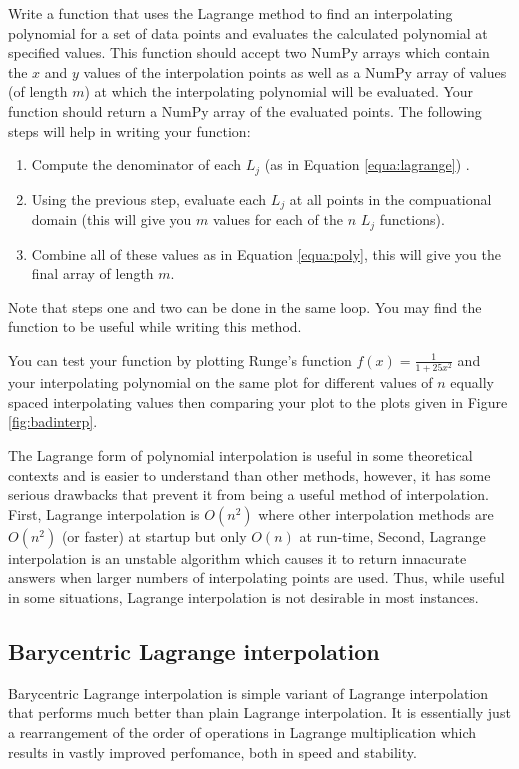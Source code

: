 \begin{problem}
Write a function that uses the Lagrange method to find an interpolating polynomial for a set of data points and evaluates the calculated polynomial at specified values.
This function should accept two NumPy arrays which contain the $x$ and $y$ values of the interpolation points as well as a NumPy array of values (of length $m$) at which the interpolating polynomial
will be evaluated.
Your function should return a NumPy array of the evaluated points.
The following steps will help in writing your function:
\begin{enumerate}
\item Compute the denominator of each $L_j$ (as in Equation \ref{equa:lagrange}) .
\item Using the previous step, evaluate each $L_j$ at all points in the compuational domain (this will give you $m$ values for each of the $n$ $L_j$ functions).
\item Combine all of these values as in Equation \ref{equa:poly}, this will give you the final array of length $m$.
\end{enumerate}
Note that steps one and two can be done in the same loop.
You may find the function  to be useful while writing this method.

You can test your function by plotting Runge's function $f(x)=\frac{1}{1+25x^2}$ and your interpolating polynomial on the same plot for different values of $n$ equally spaced interpolating values then comparing
your plot to the plots given in Figure \ref{fig:badinterp}.
\label{prob:lagrange}
\end{problem}

The Lagrange form of polynomial interpolation is useful in some theoretical contexts and is easier to understand than other methods, however, it has some serious drawbacks that prevent it from being a
useful method of interpolation.
First, Lagrange interpolation is $O(n^2)$ where other interpolation methods are $O(n^2)$ (or faster) at startup but only $O(n)$ at run-time,
Second, Lagrange interpolation is an unstable algorithm which causes it to return innacurate answers when larger numbers of interpolating points are used.
Thus, while useful in some situations, Lagrange interpolation is not desirable in most instances.

\subsection*{Barycentric Lagrange interpolation}
Barycentric Lagrange interpolation is simple variant of Lagrange interpolation that performs much better than plain Lagrange interpolation.
It is essentially just a rearrangement of the order of operations in Lagrange multiplication which results in vastly improved perfomance, both in speed and stability.

